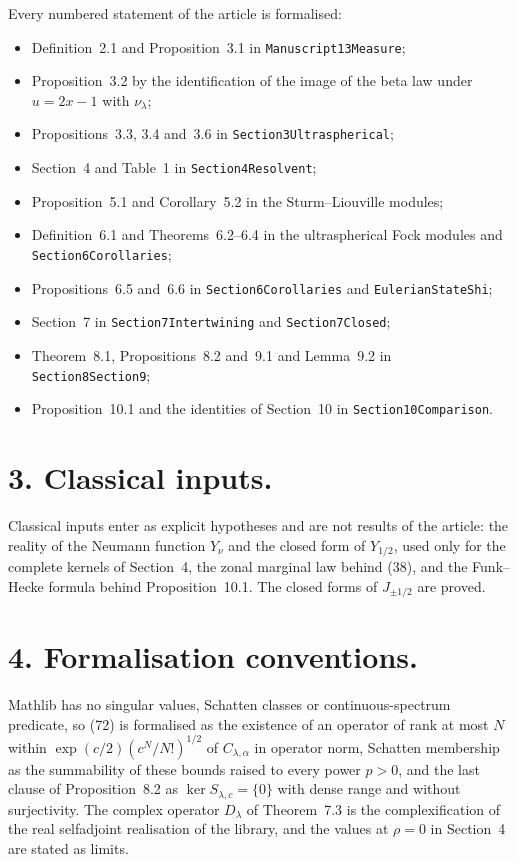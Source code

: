 \documentclass[11pt,a4paper]{article}
\newcommand{\eq}[1]{(#1)}
\begin{document}
Every numbered statement of the article is formalised:
\begin{itemize}\setlength{\itemsep}{1pt}\raggedright
\item Definition~2.1 and Proposition~3.1 in \texttt{Manuscript13Measure};
\item Proposition~3.2 by the identification of the image of the beta law under $u=2x-1$ with $\nu_\lambda$;
\item Propositions~3.3, 3.4 and~3.6 in \texttt{Section3Ultraspherical};
\item Section~4 and Table~1 in \texttt{Section4Resolvent};
\item Proposition~5.1 and Corollary~5.2 in the Sturm--Liouville modules;
\item Definition~6.1 and Theorems~6.2--6.4 in the ultraspherical Fock modules and \texttt{Section6Corollaries};
\item Propositions~6.5 and~6.6 in \texttt{Section6Corollaries} and \texttt{EulerianStateShi};
\item Section~7 in \texttt{Section7Intertwining} and \texttt{Section7Closed};
\item Theorem~8.1, Propositions~8.2 and~9.1 and Lemma~9.2 in \texttt{Section8Section9};
\item Proposition~10.1 and the identities of Section~10 in \texttt{Section10Comparison}.
\end{itemize}

\section*{3. Classical inputs.}
Classical inputs enter as explicit hypotheses and are not results of the article: the reality of the Neumann function $Y_\nu$ and the closed form of $Y_{1/2}$, used only for the complete kernels of Section~4, the zonal marginal law behind \eq{38}, and the Funk--Hecke formula behind Proposition~10.1. The closed forms of $J_{\pm1/2}$ are proved.

\section*{4. Formalisation conventions.}
Mathlib has no singular values, Schatten classes or continuous-spectrum predicate, so \eq{72} is formalised as the existence of an operator of rank at most $N$ within $\exp(c/2)(c^N/N!)^{1/2}$ of $C_{\lambda,\alpha}$ in operator norm, Schatten membership as the summability of these bounds raised to every power $p>0$, and the last clause of Proposition~8.2 as $\ker S_{\lambda,c}=\{0\}$ with dense range and without surjectivity. The complex operator $D_\lambda$ of Theorem~7.3 is the complexification of the real selfadjoint realisation of the library, and the values at $\rho=0$ in Section~4 are stated as limits.
\end{document}
